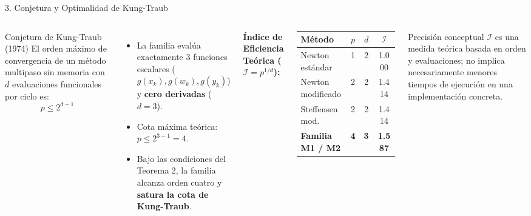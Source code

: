 \documentclass[aspectratio=169,10pt]{beamer}
\begin{document}
\begin{frame}{3. Conjetura y Optimalidad de Kung-Traub}
  \begin{columns}
    \begin{block}{Conjetura de Kung-Traub (1974)}
      El orden máximo de convergencia de un método multipaso sin memoria con $d$ evaluaciones funcionales por ciclo es:
      $$p \le 2^{d-1}$$
    \end{block}
    \begin{itemize}
      \item La familia evalúa exactamente 3 funciones escalares ($g(x_k), g(w_k), g(y_k)$) y \textbf{cero derivadas} ($d=3$).
      \item Cota máxima teórica: $p \le 2^{3-1} = 4$.
      \item Bajo las condiciones del Teorema 2, la familia alcanza orden cuatro y \textbf{satura la cota de Kung-Traub}.
    \end{itemize}
    \textbf{Índice de Eficiencia Teórica ($\mathcal{I} = p^{1/d}$):}
    \begin{table}
      \centering\small
      \begin{tabular}{lccc}
        \toprule
        Método & $p$ & $d$ & $\mathcal{I}$ \\
        \midrule
        Newton estándar & 1 & 2 & 1.000 \\
        Newton modificado & 2 & 2 & 1.414 \\
        Steffensen mod. & 2 & 2 & 1.414 \\
        \textbf{Familia M1 / M2} & \textbf{4} & \textbf{3} & \textbf{1.587} \\
        \bottomrule
      \end{tabular}
    \end{table}
    \vspace{0.1cm}
    \begin{alertblock}{Precisión conceptual}
      $\mathcal{I}$ es una medida teórica basada en orden y evaluaciones; no implica necesariamente menores tiempos de ejecución en una implementación concreta.
    \end{alertblock}
  \end{columns}
\end{frame}
\end{document}
